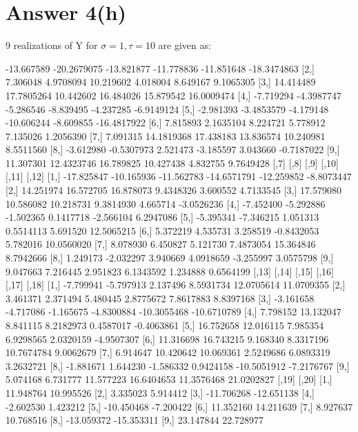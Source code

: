 \documentclass[12pt]{article}
\begin{document}
\clearpage
\section*{Answer 4(h)}

9 realizations of Y for $\sigma=1, \tau=10$ are given as:
\begin{Schunk}
\begin{Soutput}
            [,1]        [,2]       [,3]       [,4]       [,5]        [,6]
 [1,] -13.667589 -20.2679075 -13.821877 -11.778836 -11.851648 -18.3474863
 [2,]   7.306048   4.9708094  10.219602   4.018004   8.649167   9.1065305
 [3,]  14.414489  17.7805264  10.442602  16.484026  15.879542  16.0009474
 [4,]  -7.719294  -4.3987747  -5.286546  -8.839495  -4.237285  -6.9149124
 [5,]  -2.981393  -3.4853579  -4.179148 -10.606244  -8.609855 -16.4817922
 [6,]   7.815893   2.1635104   8.224721   5.778912   7.135026   1.2056390
 [7,]   7.091315  14.1819368  17.438183  13.836574  10.240981   8.5511560
 [8,]  -3.612980  -0.5307973   2.521473  -3.185597   3.043660  -0.7187022
 [9,]  11.307301  12.4323746  16.789825  10.427438   4.832755   9.7649428
            [,7]       [,8]       [,9]       [,10]      [,11]      [,12]
 [1,] -17.825847 -10.165936 -11.562783 -14.6571791 -12.259852 -8.8073447
 [2,]  14.251974  16.572705  16.878073   9.4348326   3.600552  4.7133545
 [3,]  17.579080  10.586082  10.218731   9.3814930   4.665714 -3.0526236
 [4,]  -7.452400  -5.292886  -1.502365   0.1417718  -2.566104  6.2947086
 [5,]  -5.395341  -7.346215   1.051313   0.5514113   5.691520 12.5065215
 [6,]   5.372219   4.535731   3.258519  -0.8432053   5.782016 10.0560020
 [7,]   8.078930   6.450827   5.121730   7.4873054  15.364846  8.7942666
 [8,]   1.249173  -2.032297   3.940669   4.0918659  -3.255997  3.0575798
 [9,]   9.047663   7.216445   2.951823   6.1343592   1.234888  0.6564199
          [,13]     [,14]     [,15]      [,16]       [,17]       [,18]
 [1,] -7.799941 -5.797913  2.137496  8.5931734  12.0705614  11.0709355
 [2,]  3.461371  2.371494  5.480445  2.8775672   7.8617883   8.8397168
 [3,] -3.161658 -4.717086 -1.165675 -4.8300884 -10.3055468 -10.6710789
 [4,]  7.798152 13.132047  8.841115  8.2182973   0.4587017  -0.4063861
 [5,] 16.752658 12.016115  7.985354  6.9298565   2.0320159  -4.9507307
 [6,] 11.316698 16.743215  9.168340  8.3317196  10.7674784   9.0062679
 [7,]  6.914647 10.420642 10.069361  2.5249686   6.0893319   3.2632721
 [8,] -1.881671  1.644230 -1.586332  0.9424158 -10.5051912  -7.2176767
 [9,]  5.074168  6.731777 11.577223 16.6404653  11.3576468  21.0202827
           [,19]      [,20]
 [1,]  11.948764  10.995526
 [2,]   3.335023   5.914412
 [3,] -11.706268 -12.651138
 [4,]  -2.602530   1.423212
 [5,] -10.450468  -7.200422
 [6,]  11.352160  14.211639
 [7,]   8.927637  10.768516
 [8,] -13.059372 -15.353311
 [9,]  23.147844  22.728977
\end{Soutput}
\end{Schunk}
\end{document}
